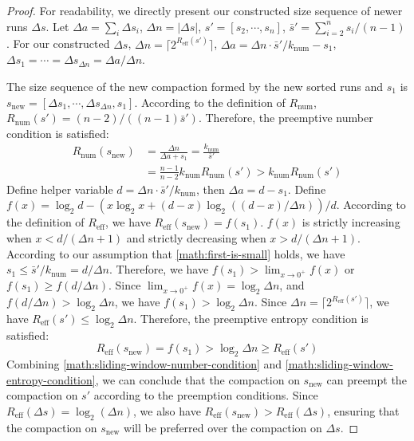 \documentclass[sigconf]{acmart}
\begin{document}
\begin{proof}
For readability, we directly present our constructed size sequence of newer runs $\Delta s$. Let $\Delta a = \sum_i \Delta s_i$, $\Delta n = |\Delta s|$, $s' = [s_2, \cdots, s_n]$, $\bar s' = \sum_{i=2}^{n} s_i / (n-1)$. For our constructed $\Delta s$, $\Delta n = \lceil 2^{R_\text{eff}(s')} \rceil$, $\Delta a = \Delta n \cdot \bar s' / k_\text{num} - s_1$, $\Delta s_1 = \cdots = \Delta s_{\Delta n} = \Delta a / \Delta n$.

The size sequence of the new compaction formed by the new sorted runs and $s_1$ is $s_\text{new} = [\Delta s_1, \cdots, \Delta s_{\Delta n}, s_1]$. According to the definition of $R_\text{num}$, $R_\text{num}(s') = (n-2) / ((n-1)\bar s')$. Therefore, the preemptive number condition is satisfied:
\begin{equation}\label{math:sliding-window-number-condition}
\begin{aligned}
R_\text{num}(s_\text{new})
&= \frac{\Delta n}{\Delta a + s_1}
= \frac{k_\text{num}}{\bar s'} \\
&= \frac{n-1}{n-2} k_\text{num} R_\text{num}(s')
> k_\text{num} R_\text{num}(s')
\end{aligned}
\end{equation}
Define helper variable $d = \Delta n \cdot \bar s' / k_\text{num}$, then $\Delta a = d - s_1$. Define $f(x) = \log_2 d - (x \log_2 x + (d - x) \log_2 ((d - x) / \Delta n)) / d$. According to the definition of $R_\text{eff}$, we have $R_\text{eff}(s_\text{new}) = f(s_1)$. $f(x)$ is strictly increasing when $x < d / (\Delta n + 1)$ and strictly decreasing when $x > d / (\Delta n + 1)$. According to our assumption that \cref{math:first-is-small} holds, we have $s_1 \le \bar s' / k_\text{num} = d / \Delta n$. Therefore, we have $f(s_1) > \lim_{x\rightarrow 0^+} f(x)$ or $f(s_1) \ge f(d/\Delta n)$. Since $\lim_{x\rightarrow 0^+} f(x) = \log_2 \Delta n$, and $f(d / \Delta n) > \log_2 \Delta n$, we have $f(s_1) > \log_2 \Delta n$. Since $\Delta n = \lceil 2^{R_\text{eff}(s')} \rceil$, we have $R_\text{eff}(s') \le \log_2 \Delta n$. Therefore, the preemptive entropy condition is satisfied:
\begin{equation}\label{math:sliding-window-entropy-condition}
R_\text{eff}(s_\text{new}) = f(s_1) > \log_2 \Delta n \ge R_\text{eff}(s')
\end{equation}
Combining \cref{math:sliding-window-number-condition} and \cref{math:sliding-window-entropy-condition}, we can conclude that the compaction on $s_\text{new}$ can preempt the compaction on $s'$ according to the preemption conditions. Since $R_\text{eff}(\Delta s) = \log_2(\Delta n)$, we also have $R_\text{eff}(s_\text{new}) > R_\text{eff}(\Delta s)$, ensuring that the compaction on $s_\text{new}$ will be preferred over the compaction on $\Delta s$.
\end{proof}

% 
% 
\end{document}
